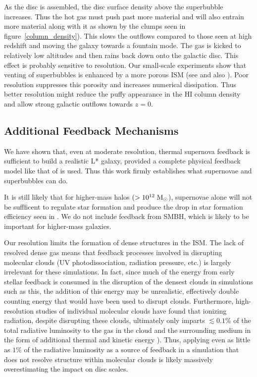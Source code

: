 As the disc is assembled, the disc surface density above the 
superbubble increases.  Thus the hot gas must push past
more material and will also entrain more material along with it as shown by
 the clumps seen in figure~\ref{column_density}).  
This slows the outflows compared to those 
seen at high redshift and moving the galaxy
towards a fountain mode.  The gas is kicked to relatively low altitudes and
then rains back down onto the galactic disc.  This effect is probably
sensitive to resolution.  Our small-scale experiments show
 that venting of superbubbles is enhanced by a more porous ISM 
(see \citealt{Keller2014} and also \citealt{Nath2013}).  
Poor resolution suppresses this porosity and increases
numerical dissipation.  Thus better resolution might reduce the puffy
appearance in the HI column density and allow strong galactic
outflows towards $z=0$.  

\subsection{Additional Feedback Mechanisms}

We have shown that, even at moderate resolution, thermal supernova feedback is
sufficient to build a realistic L* galaxy, provided a complete
physical feedback model like that of \citet{Keller2014} is used.    
Thus this work firmly establishes what supernovae and superbubbles can do.

It is still likely that for higher-mass halos $(>10^{12}\; \rm{M_\odot}$),
supernovae alone will not be suffficent to regulate star formation and produce
the drop in star formation efficiency seen in \citet{Moster2013,Behroozi2013}.
We do not include feedback from SMBH, which is likely to be
important for higher-mass galaxies.  

Our resolution limits the formation of dense structures in the ISM.  The lack of
resolved dense gas means that feedback processes involved in disrupting
molecular clouds (UV photodissociation, radiation pressure, etc.) is largely
irrelevant for these simulations.  In fact, since much of the energy from early
stellar feedback is consumed in the disruption of the densest clouds in
simulations such as this, the addition of this energy may be unrealistic,
effectively double counting energy that would have been used to disrupt clouds.
Furthermore, high-resolution studies of individual molecular clouds have found
that ionizing radiation, despite disrupting these clouds, ultimately only
imparts $\lesssim 0.1\%$ of the total radiative luminosity to the gas in the
cloud and the surrounding medium in the form of additional thermal and kinetic
energy \citep{Dale2005, Gendelev2012, Walch2012}).  Thus, applying even as
little as $1\%$ of the radiative luminosity as a source of feedback in a
simulation that does not resolve structure within molecular clouds is likely
massively overestimating the impact on disc scales.

